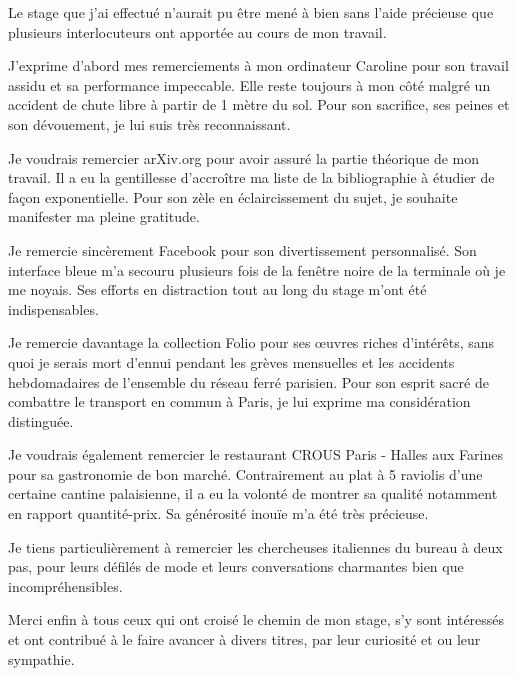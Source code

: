 



    Le stage que j'ai effectué n'aurait pu être mené à bien sans l'aide précieuse que plusieurs interlocuteurs ont apportée au cours de mon travail.

    J'exprime d'abord mes remerciements à mon ordinateur Caroline pour son travail assidu et sa performance impeccable. Elle reste toujours à mon côté malgré un accident de chute libre à partir de 1 mètre du sol. Pour son sacrifice, ses peines et son dévouement, je lui suis très reconnaissant.

    Je voudrais remercier arXiv.org pour avoir assuré la partie théorique de mon travail. Il a eu la gentillesse d'accroître ma liste de la bibliographie à étudier de façon exponentielle. Pour son zèle en éclaircissement du sujet, je souhaite manifester ma pleine gratitude.

    Je remercie sincèrement Facebook pour son divertissement personnalisé. Son interface bleue m'a secouru plusieurs fois de la fenêtre noire de la terminale où je me noyais. Ses efforts en distraction tout au long du stage m'ont été indispensables.

    Je remercie davantage la collection Folio pour ses {\oe}uvres riches d'intérêts, sans quoi je serais mort d'ennui pendant les grèves mensuelles et les accidents hebdomadaires de l'ensemble du réseau ferré parisien. Pour son esprit sacré de combattre le transport en commun à Paris, je lui exprime ma considération distinguée.

    Je voudrais également remercier le restaurant CROUS Paris - Halles aux Farines pour sa gastronomie de bon marché. Contrairement au plat à 5 raviolis d'une certaine cantine palaisienne, il a eu la volonté de montrer sa qualité notamment en rapport quantité-prix. Sa générosité inouïe m'a été très précieuse.

    Je tiens particulièrement à remercier les chercheuses italiennes du bureau à deux pas, pour leurs défilés de mode et leurs conversations charmantes bien que incompréhensibles.

    Merci enfin à tous ceux qui ont croisé le chemin de mon stage, s'y sont intéressés et ont contribué à le faire avancer à divers titres, par leur curiosité et ou leur sympathie.


